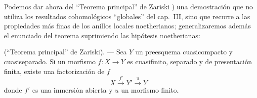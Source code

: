 \begin{env}[8.12.5]
\label{IV.8.12.5}
Podemos dar ahora del ``Teorema principal'' de Zariski ) una demostración que no utiliza los resultados cohomológicos ``globales'' del cap.~III, sino que recurre a las propiedades más finas de los anillos locales noetherianos; generalizaremos además el enunciado del teorema suprimiendo las hipótesis noetherianas:
\end{env}

\begin{theorem}[8.12.6]
\label{IV.8.12.6}
(``Teorema principal'' de Zariski). --- Sea $Y$ un preesquema cuasicompacto y cuasiseparado.
Si un morfismo $f:X\to Y$ es cuasifinito, separado y de presentación finita, existe una factorización de $f$
\begin{equation}
\label{IV.8.12.6.1}
X\xrightarrow{f'}Y'\xrightarrow{u}Y \tag{8.12.6.1}
\end{equation}
donde $f'$ es una inmersión abierta y $u$ un morfismo finito.
\end{theorem}


